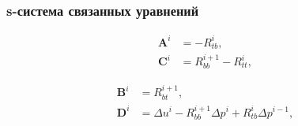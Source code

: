 \begin{frame}
    \frametitle{s-система связанных уравнений}
    \begin{minipage}[t]{0.49\linewidth}
        \begin{equation*}
            \begin{split}
                \textbf{A}^{i} & = -R^{i}_{tb},\\
                \textbf{C}^{i} & = R^{i+1}_{bb}-R^{i}_{tt},
            \end{split}
        \end{equation*}
    \end{minipage}
    \hfill
    \begin{minipage}[t]{0.49\linewidth}
        \begin{equation*}
            \begin{split}
                \textbf{B}^{i} & = R^{i+1}_{bt},\\
                \textbf{D}^{i} & = \Delta u^{i}-R^{i+1}_{bb}\Delta p^{i}+R^{i}_{tb}\Delta p^{i-1},
            \end{split}
        \end{equation*}
    \end{minipage}
    \vspace{5mm}
    

\end{frame}
